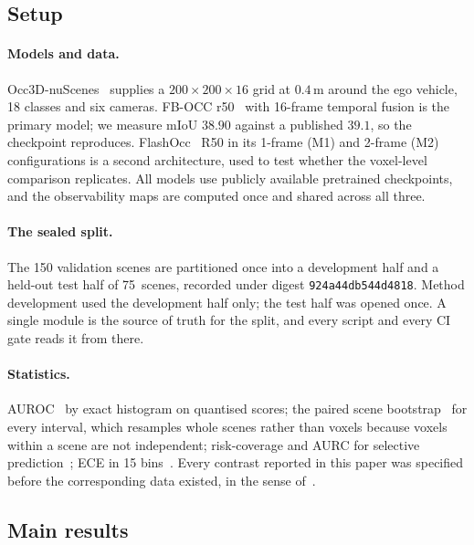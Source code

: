 \documentclass[10pt,twocolumn,letterpaper]{article}
\newcommand{\nScenes}{75}
\newcommand{\splitdigest}{\texttt{924a44db544d4818}}
\begin{document}
\subsection{Setup}
\paragraph{Models and data.}
Occ3D-nuScenes~\cite{tian2023occ3d, caesar2020nuscenes} supplies a
$200\times200\times16$ grid at $0.4$\,m around the ego vehicle, 18 classes
and six cameras. FB-OCC r50~\cite{li2023fbocc} with 16-frame temporal
fusion is the primary model; we measure mIoU $38.90$ against a published
$39.1$, so the checkpoint reproduces. FlashOcc~\cite{yu2023flashocc} R50 in
its 1-frame (M1) and 2-frame (M2) configurations is a second architecture,
used to test whether the voxel-level comparison replicates. All models use
publicly available pretrained checkpoints, and the observability maps are
computed once and shared across all three.

\paragraph{The sealed split.}
The 150 validation scenes are partitioned once into a development half and
a held-out test half of \nScenes\ scenes, recorded under digest
\splitdigest. Method development used the development half only; the test
half was opened once. A single module is the source of truth for the
split, and every script and every CI gate reads it from there.

\paragraph{Statistics.}
AUROC~\cite{hanley1982roc} by exact histogram on quantised scores; the
paired scene bootstrap~\cite{efron1986bootstrap} for every interval, which
resamples whole scenes rather than voxels because voxels within a scene are
not independent; risk-coverage and AURC for selective
prediction~\cite{elyaniv2010selective, geifman2017selective}; ECE in 15
bins~\cite{naeini2015ece}. Every contrast reported in this paper was
specified before the corresponding data existed, in the sense
of~\cite{nosek2018preregistration}.

\subsection{Main results}
\label{sec:main}
\end{document}
